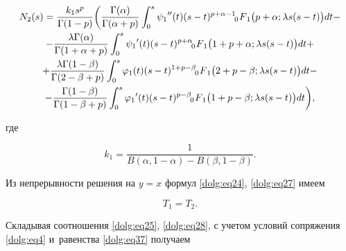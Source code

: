 \begin{multline}

N_2(s) = \frac{k_1 s^p}{\Gamma(1-p)} 

\biggl( 

\frac{\Gamma(\alpha)}{\Gamma(\alpha+p)} \int _0^s {\psi_1}''(t) (s-t)^{p+\alpha-1}  \,\,

F_{\hspace{-4mm}0 \hspace{3mm}1} \bigl(p+\alpha;\lambda s (s-t)\bigr) dt - 

\\

- \frac{\lambda\Gamma(\alpha)}{\Gamma(1+\alpha+p)} \int _0^s {\psi_1}'(t) (s-t)^{p+\alpha}  \,\,

F_{\hspace{-4mm}0 \hspace{3mm}1} \bigl(1+p+\alpha;\lambda s (s-t)\bigr) dt + 

\\

 +\frac{\lambda\Gamma(1-\beta)}{\Gamma(2-\beta+p)} \int _0^s {\varphi_1}(t) (s-t)^{1+p-\beta}  \,\,

F_{\hspace{-4mm}0 \hspace{3mm}1} \bigl(2+p-\beta;\lambda s (s-t)\bigr) dt - 

\\

\label{dolg:eq36}

-\frac{\Gamma(1-\beta)}{\Gamma(1-\beta+p)} \int _0^s {\varphi_1}'(t) (s-t)^{p-\beta}  \,\,

F_{\hspace{-4mm}0 \hspace{3mm}1} \bigl(1+p-\beta;\lambda s (s-t)\bigr) dt\biggr),

\end{multline}

где 

$$k_1=\frac{1}{B(\alpha, 1-\alpha) - B(\beta, 1-\beta)}.$$ 

Из непрерывности решения на $y=x$ формул \eqref{dolg:eq24}, \eqref{dolg:eq27} имеем

\begin{equation}

\label{dolg:eq37}

T_1 = T_2.

\end{equation}



Складывая соотношения \eqref{dolg:eq25}, \eqref{dolg:eq28}, с учетом условий сопряжения \eqref{dolg:eq4} и~равенства \eqref{dolg:eq37} получаем

